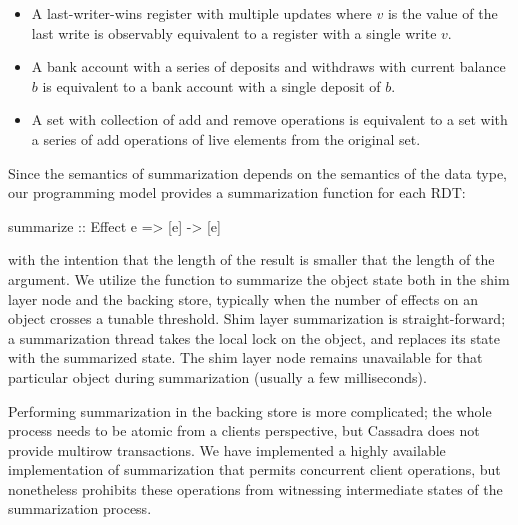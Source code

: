 \begin{itemize}
\setlength{\itemsep}{2pt}
\item A last-writer-wins register with multiple updates where $v$ is the value
of the last write is observably equivalent to a register with a single write
$v$.

\item A bank account with a series of deposits and withdraws with current
balance $b$ is equivalent to a bank account with a single deposit of $b$.

\item A set with collection of add and remove operations is equivalent to a set
with a series of add operations of live elements from the original set.
\end{itemize}

\noindent Since the semantics of summarization depends on the semantics of the data
type, our programming model provides a summarization function for each RDT:
\begin{codehaskell}
summarize :: Effect e => [e] -> [e]
\end{codehaskell}
\noindent with the intention that the length of the result is smaller that the
length of the argument. We utilize the  function to summarize the
object state both in the shim layer node and the backing store, typically when
the number of effects on an object crosses a tunable threshold. Shim layer
summarization is straight-forward; a summarization thread takes the local lock
on the object, and replaces its state with the summarized state. The shim layer
node remains unavailable for that particular object during summarization
(usually a few milliseconds).

Performing summarization in the backing store is more complicated; the whole
process needs to be atomic from a clients perspective, but Cassadra does not
provide multirow transactions. We have implemented a highly available
implementation of summarization that permits concurrent client operations, but
nonetheless prohibits these operations from witnessing intermediate states of
the summarization process.

